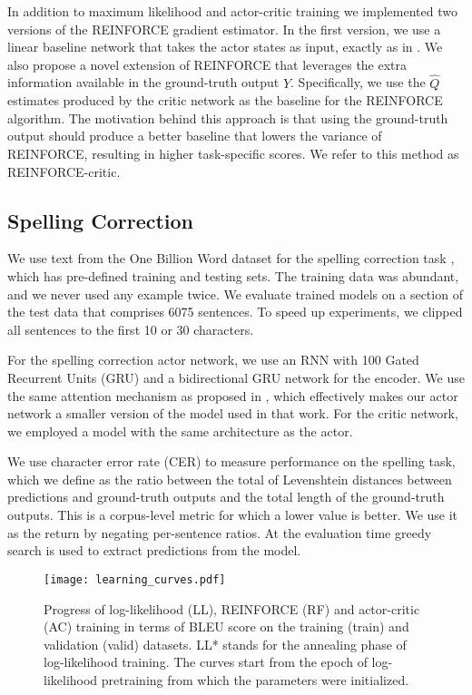 \documentclass{article} \usepackage{iclr2017_conference,times}
\begin{document}
In addition to maximum likelihood and actor-critic training we implemented two versions of
the REINFORCE gradient estimator. In the first version, we use a linear baseline network that takes
the actor states as input, exactly as in \citep{ranzato2015sequence}. 
We also propose a novel extension of REINFORCE that leverages the extra information available
in the ground-truth output $Y$. Specifically, we use the $\hat{Q}$ estimates produced by
the critic network as the baseline for the REINFORCE algorithm. The motivation behind this approach
is that using the ground-truth output should produce a better baseline that lowers
the variance of REINFORCE, resulting in higher task-specific scores. We refer
to this method as REINFORCE-critic. 
\subsection{Spelling Correction} 

We use text from the One Billion Word dataset for the spelling correction
task \citep{chelba2013one}, which has pre-defined training and testing sets.
The training data was abundant, and we never used any example twice.  We
evaluate trained models on a section of the test data that comprises 6075
sentences. To speed up experiments, we clipped all sentences to the first 10
or 30 characters.

For the spelling correction actor network, we use an RNN with 100 Gated
Recurrent Units (GRU) and a bidirectional GRU network for the encoder. We
use the same attention mechanism as proposed in \citep{bahdanau2015neural},
which effectively makes our actor network a smaller version of the model used
in that work. For the critic network, we employed a model
with the same architecture as the actor. 

We use character error rate (CER) to measure performance on the spelling
task, which we define as the ratio between the total of Levenshtein distances
between predictions and ground-truth outputs and the total length of the
ground-truth outputs. This is a corpus-level metric for which a lower value 
is better. We use it as the return by negating
per-sentence ratios. At the evaluation time greedy search is used to extract
predictions from the model.

\begin{wrapfigure}{r}{0.5\textwidth}
    \centering
    \texttt{[image: learning\_curves.pdf]}
    \caption{Progress of log-likelihood (LL), REINFORCE (RF) and actor-critic (AC) training
        in terms of BLEU score on the training (train) and
        validation (valid) datasets. LL* stands for the annealing phase of log-likelihood training. 
        The curves start from the epoch of log-likelihood
        pretraining from which the parameters were initialized. 
    }
    \label{fig:progress}       
\end{wrapfigure}    
\end{document}
